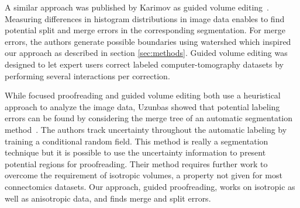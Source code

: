 A similar approach was published by Karimov \etal as guided volume editing~\cite{karimov_guided_volume_editing}. Measuring differences in histogram distributions in image data enables to find potential split and merge errors in the corresponding segmentation. For merge errors, the authors generate possible boundaries using watershed which inspired our approach as described in section \ref{sec:methods}. Guided volume editing was designed to let expert users correct labeled computer-tomography datasets by performing several interactions per correction. 

While focused proofreading and guided volume editing both use a heuristical approach to analyze the image data, Uzunbas \etal showed that potential labeling errors can be found by considering the merge tree of an automatic segmentation method~\cite{uzunbas}. The authors track uncertainty throughout the automatic labeling by training a conditional random field. This method is really a segmentation technique but it is possible to use the uncertainty information to present potential regions for proofreading. Their method requires further work to overcome the requirement of isotropic volumes, a property not given for most connectomics datasets. Our approach, guided proofreading, works on isotropic as well as anisotropic data, and finds merge and split errors.